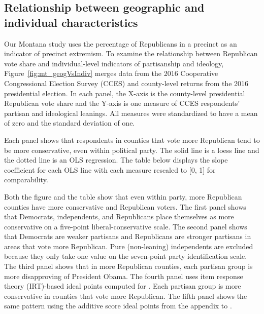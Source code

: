 \documentclass[12pt]{article}
\begin{document}


\clearpage



\restoregeometry
\newpage

\subsection{Relationship between geographic and individual characteristics}

\onehalfspacing

Our Montana study uses the percentage of Republicans in a precinct as an indicator of precinct extremism. To examine the relationship between Republican vote share and individual-level indicators of partisanship and ideology, Figure~\ref{fig:mt_geogVsIndiv} merges data from the 2016 Cooperative Congressional Election Survey (CCES) and county-level returns from the 2016 presidential election. In each panel, the X-axis is the county-level presidential Republican vote share and the Y-axis is one measure of CCES respondents' partisan and ideological leanings. All measures were standardized to have a mean of zero and the standard deviation of one.

Each panel shows that respondents in counties that vote more Republican tend to be more conservative, even within political party. The solid line is a loess line and the dotted line is an OLS regression. The table below displays the slope coefficient for each OLS line with each measure rescaled to [0, 1] for comparability. 

Both the figure and the table show that even within party, more Republican counties have more conservative and Republican voters. The first panel shows that Democrats, independents, and Republicans place themselves as more conservative on a five-point liberal-conservative scale. The second panel shows that Democrats are weaker partisans and Republicans are stronger partisans in areas that vote more Republican. Pure (non-leaning) independents are excluded because they only take one value on the seven-point party identification scale. The third panel shows that in more Republican counties, each partisan group is more disapproving of President Obama. The fourth panel uses item response theory (IRT)-based ideal points computed for \citet{GrahamOrr2020}. Each partisan group is more conservative in counties that vote more Republican. The fifth panel shows the same pattern using the additive score ideal points from the appendix to \citet{GrahamOrr2020}.
\end{document}
